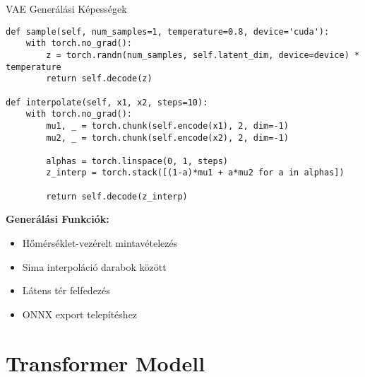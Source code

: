 \documentclass[aspectratio=169]{beamer}
\begin{document}
\begin{frame}[fragile]{VAE Generálási Képességek}

\begin{lstlisting}
def sample(self, num_samples=1, temperature=0.8, device='cuda'):
    with torch.no_grad():
        z = torch.randn(num_samples, self.latent_dim, device=device) * temperature
        return self.decode(z)

def interpolate(self, x1, x2, steps=10):
    with torch.no_grad():
        mu1, _ = torch.chunk(self.encode(x1), 2, dim=-1)
        mu2, _ = torch.chunk(self.encode(x2), 2, dim=-1)
        
        alphas = torch.linspace(0, 1, steps)
        z_interp = torch.stack([(1-a)*mu1 + a*mu2 for a in alphas])
        
        return self.decode(z_interp)
\end{lstlisting}

\textbf{Generálási Funkciók:}
\begin{itemize}
    \item Hőmérséklet-vezérelt mintavételezés
    \item Sima interpoláció darabok között
    \item Látens tér felfedezés
    \item ONNX export telepítéshez
\end{itemize}
\end{frame}

\section{Transformer Modell}
\end{document}
